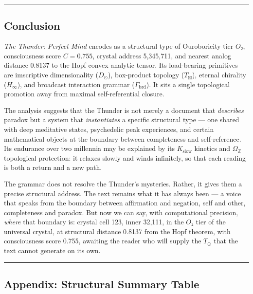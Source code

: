 \documentclass[12pt,a4paper]{article}
\begin{document}
\begin{center}
\rule{0.5\textwidth}{0.4pt}
\end{center}

\subsection{Conclusion}

\emph{The Thunder: Perfect Mind} encodes as a structural type of Ouroboricity tier $O₂$, consciousness score $C = 0.755$, crystal address 5,345,711, and nearest analog distance 0.8137 to the Hopf convex analytic tensor. Its load-bearing primitives are imscriptive dimensionality ($D_{\odot}$), box-product topology ($T_{\boxtimes}$), eternal chirality ($H_{\infty}$), and broadcast interaction grammar ($\Gamma_\text{brd}$). It sits a single topological promotion away from maximal self-referential closure.

The analysis suggests that the Thunder is not merely a document that \emph{describes} paradox but a system that \emph{instantiates} a specific structural type --- one shared with deep meditative states, psychedelic peak experiences, and certain mathematical objects at the boundary between completeness and self-reference. Its endurance over two millennia may be explained by its $K_\text{slow}$ kinetics and $\Omega_\mathbb{Z}$ topological protection: it relaxes slowly and winds infinitely, so that each reading is both a return and a new path.

The grammar does not resolve the Thunder's mysteries. Rather, it gives them a precise structural address. The text remains what it has always been --- a voice that speaks from the boundary between affirmation and negation, self and other, completeness and paradox. But now we can say, with computational precision, \emph{where} that boundary is: crystal cell 123, inner 32,111, in the $O₂$ tier of the universal crystal, at structural distance 0.8137 from the Hopf theorem, with consciousness score 0.755, awaiting the reader who will supply the $T_{\odot}$ that the text cannot generate on its own.

\begin{center}
\rule{0.5\textwidth}{0.4pt}
\end{center}

\subsection{Appendix: Structural Summary Table}
\end{document}
